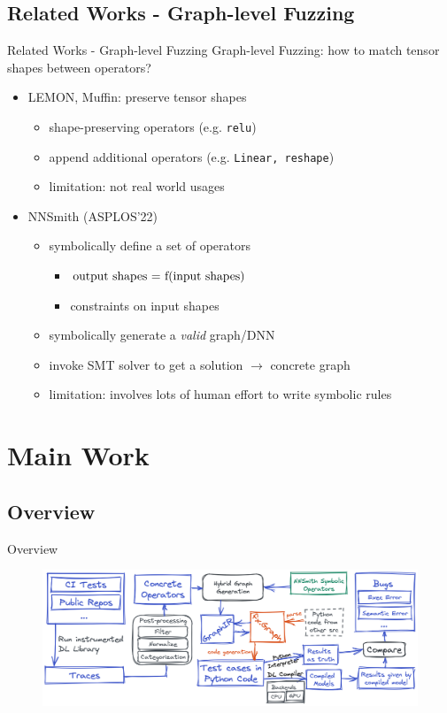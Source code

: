 \documentclass{beamer}
\begin{document}
\subsection{Related Works - Graph-level Fuzzing}
\begin{frame}{Related Works - Graph-level Fuzzing}
    Graph-level Fuzzing: how to match tensor shapes between operators?
    \begin{itemize}
        \item LEMON, Muffin: preserve tensor shapes
        \begin{itemize}
            \item shape-preserving operators (e.g. \texttt{relu})
            \item append additional operators (e.g. \texttt{Linear, reshape})
            \item limitation: not real world usages
        \end{itemize}
        \item NNSmith (ASPLOS'22)
        \begin{itemize}
            \item symbolically define a set of operators
            \begin{itemize}
                \item $\text{output shapes = f(\text{input shapes})}$
                \item constraints on input shapes
            \end{itemize}
            \item symbolically generate a \textit{valid} graph/DNN
            \item invoke SMT solver to get a solution $\rightarrow$ concrete graph
            \item limitation: involves lots of human effort to write symbolic rules
        \end{itemize}
    \end{itemize}
\end{frame}

\section{Main Work}

\subsection{Overview}
\begin{frame}{Overview}
    \begin{figure}
        \centering
        \includegraphics[scale=0.25]{figs/overview.png}
        \label{fig:overview}
    \end{figure}
\end{frame}
\end{document}
